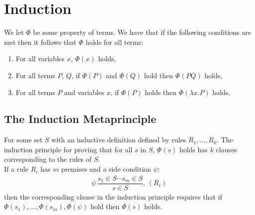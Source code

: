 \section{Induction}

We let $\Phi$ be some property of terms. We have that
if the following conditions are met then it follows that
$\Phi$ holds for all terms: \begin{enumerate}
    \item For all variables $x$, $\Phi(x)$ holds,
    \item For all terms $P$, $Q$, if $\Phi(P)$ and
        $\Phi(Q)$ hold then $\Phi(PQ)$ holds,
    \item For all terms $P$ and variables $x$, if
        $\Phi(P)$ holds then $\Phi(\lambda x.P)$ holds.
\end{enumerate}

\subsection{The Induction Metaprinciple}

For some set $S$ with an inductive definition defined by
rules $R_1, \ldots, R_k$. The induction principle for proving
that for all $s$ in $S$, $\Phi(s)$ holds has $k$ clauses
corresponding to the rules of $S$.
\\[\baselineskip]
If a rule $R_i$ has $m$ premises and a side condition $\psi$:
\begin{align*}
    \psi \, \dfrac{s_1 \in S \cdots s_m \in S}{s \in S}, \, (R_i)
\end{align*} then the corresponding clause in the induction
principle requires that if 
\linebreak $\Phi(s_1), \ldots, \Phi(s_m), \Phi(\psi)$
hold then $\Phi(s)$ holds.
